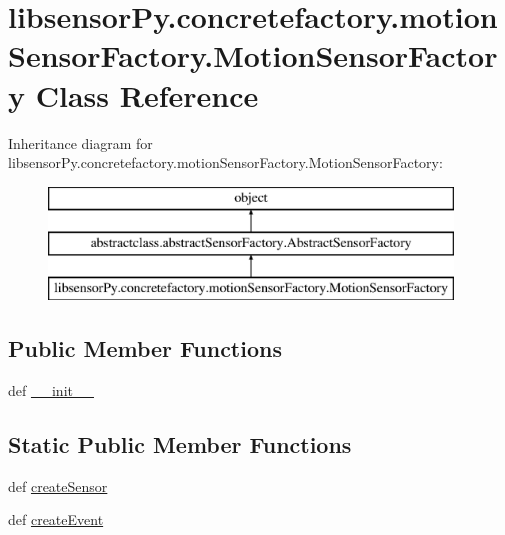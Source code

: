 \hypertarget{classlibsensorPy_1_1concretefactory_1_1motionSensorFactory_1_1MotionSensorFactory}{}\section{libsensor\+Py.\+concretefactory.\+motion\+Sensor\+Factory.\+Motion\+Sensor\+Factory Class Reference}
\label{classlibsensorPy_1_1concretefactory_1_1motionSensorFactory_1_1MotionSensorFactory}
Inheritance diagram for libsensor\+Py.\+concretefactory.\+motion\+Sensor\+Factory.\+Motion\+Sensor\+Factory\+:\begin{figure}[H]
\begin{center}
\leavevmode
\includegraphics[height=3.000000cm]{classlibsensorPy_1_1concretefactory_1_1motionSensorFactory_1_1MotionSensorFactory}
\end{center}
\end{figure}
\subsection*{Public Member Functions}
\begin{DoxyCompactItemize}
\item 
def \hyperlink{classlibsensorPy_1_1concretefactory_1_1motionSensorFactory_1_1MotionSensorFactory_af7ab40154b0f3f70db7e9c8048d51d18}{\+\_\+\+\_\+init\+\_\+\+\_\+}
\end{DoxyCompactItemize}
\subsection*{Static Public Member Functions}
\begin{DoxyCompactItemize}
\item 
def \hyperlink{classlibsensorPy_1_1concretefactory_1_1motionSensorFactory_1_1MotionSensorFactory_a2494a4fd80d4b0cf5132093a01b6fa23}{create\+Sensor}
\item 
def \hyperlink{classlibsensorPy_1_1concretefactory_1_1motionSensorFactory_1_1MotionSensorFactory_a75e28dfda26aabdcd42c2e34ab7609f6}{create\+Event}
\end{DoxyCompactItemize}


